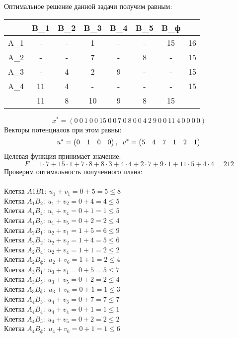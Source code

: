 \documentclass{article}
\begin{document}
\noindent Оптимальное решение данной задачи получим равным: 
\begin{table}[H]
    \centering
    \begin{tabular}{|c|c|c|c|c|c|c| |c|}
    \hline
        &\cellcolor{myGren} B_1 & \cellcolor{myGren}B_2 & \cellcolor{myGren}B_3 & \cellcolor{myGren}B_4 & \cellcolor{myGren} B_5 & \cellcolor{myGren} B_ф &  \\ \hline
       \cellcolor{myGren} A_1 & - & - & 1 & - & - & 15 & 16\\ \hline
       \cellcolor{myGren} A_2 & - & - & 7 & - & 8 & - & 15\\  \hline
       \cellcolor{myGren} A_3 & - & 4 & 2 & 9 & - & - & 15\\ \hline
       \cellcolor{myGren} A_4 & 11 & 4 & - & - & - & - & 15\\ \hline\hline
            & 11 & 8 & 10 & 9 & 8 & 15 & \\
            \hline
    \end{tabular}
\end{table}
$$x^{*} = (0~0~1~0~0~15~0~0~7~0~8~0~0~4~2~9~0~0~11~4~0~0~0~0)$$
\noindent Векторы потенциалов при этом равны:
\begin{equation*}
u^*=
    \begin{pmatrix}
        0 &1 &0 &0
    \end{pmatrix}
,\;\;v^*=
    \begin{pmatrix}
        5 &4 &7 &1 &2 &1
    \end{pmatrix}\\
\end{equation*}
Целевая функция принимает значение:
$$F = 1\cdot 7 + 15\cdot 1 + 7\cdot 8 + 8\cdot 3 + 4\cdot 4 + 2\cdot 7 + 9\cdot 1 + 11\cdot 5+ 4\cdot 4 = 212$$
Проверим оптимальность полученного плана:\\\\
Клетка $A1B1:~u_1+v_1=0+5=5\le8$\\
Клетка $A_1B_2:~u_1+v_2=0+4=4\le5$\\
Клетка $A_1B_4:~u_1+v_4=0+1=1\le 5$\\
Клетка $A_1B_5:~u_1+v_5=0+2=2\le 4$\\
Клетка $A_2B_1:~u_2+v_1=1+5=6\le 9$\\
Клетка $A_2B_2:~u_2+v_2=1+4=5\le 6$\\
Клетка $A_2B_4:~u_2+v_4=1+1=2\le 2$\\
Клетка $A_2B_ф:~u_2+v_6=1+1=2\le 4$\\
Клетка $A_3B_1:~u_3+v_1=0+5=5\le 7$\\
Клетка $A_3B_5:~u_3+v_5=0+2=2\le 4$\\
Клетка $A_3B_ф:~u_3+v_6=0+1=1\le 3$\\
Клетка $A_4B_3:~u_4+v_3=0+7=7\le 7$\\
Клетка $A_4B_4:~u_4+v_4=0+1=1\le 1$\\
Клетка $A_4B_5:~u_4+v_5=0+2=2\le 2$\\
Клетка $A_4B_ф:~u_4+v_6=0+1=1\le 6$\\
\end{document}
